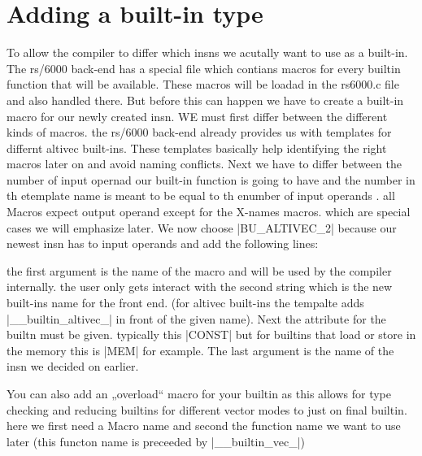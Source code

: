 \chapter{Adding a built-in type}
\label{chapter:adding builtin}

To allow the compiler to differ which insns we acutally want to use as a built-in. The rs/6000 back-end has a special file which contians macros for every builtin function that will be available. These  macros will be loadad in the rs6000.c file and also handled there. But before this can happen we have to create a built-in macro for our newly created insn.
WE must first differ between the different kinds of macros. the rs/6000 back-end already provides us with templates for differnt altivec built-ins. These templates basically help identifying the right macros later on and avoid naming conflicts.
Next we have to differ between the number of input opernad our built-in function is going to have and the number  in th etemplate name is meant to be equal to th enumber of input operands . all Macros expect output operand except for the X-names macros. which are special cases we will emphasize later.
We now choose |BU_ALTIVEC_2| because our newest insn has to input operands and add the following lines:

the first argument is the name of the macro and will be used by the compiler internally. the user only gets interact with the second string which is the new built-ins name for the front end. (for altivec built-ins the tempalte adds |__builtin_altivec_| in front of the given name). Next the attribute for the builtn must be given. typically this |CONST| but for builtins that load or store in the memory this is |MEM| for example. The last argument is the name of the insn we decided on earlier.

You can also add an „overload“ macro for your builtin as this allows for type checking and reducing builtins for different vector modes to just on final builtin.
here we first need a Macro name and second the function name we want to use later (this functon name is preceeded by |__builtin_vec_|)

